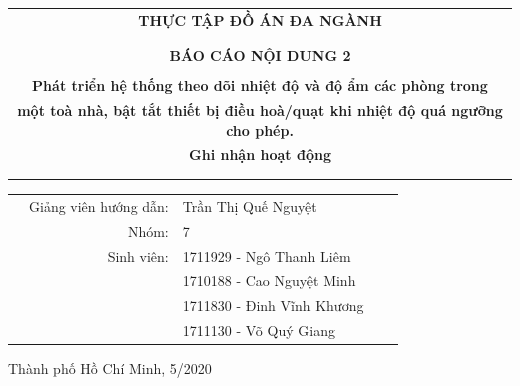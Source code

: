 \begin{titlepage}
\begin{center}
\begin{tabular}{c}
\multicolumn{1}{c}{\textbf{{\Huge THỰC TẬP ĐỒ ÁN ĐA NGÀNH}}}\\
\\ \hline \\
\textbf{{\Large BÁO CÁO NỘI DUNG 2}}\\
\\
\textbf{{\large Phát triển hệ thống theo dõi nhiệt độ và độ ẩm các phòng trong  }}\\
\textbf{{\large một toà nhà, bật tắt thiết bị điều hoà/quạt khi nhiệt độ quá ngưỡng cho phép. }}\\
\textbf{{\large Ghi nhận hoạt động}}\\
\\ \hline \\
\end{tabular}
\end{center}
	\begin{table}[h]
	\begin{tabular}{rrlrr}
		\hspace{5cm} 
		& {\large Giảng viên hướng dẫn}: & {\large Trần Thị Quế Nguyệt} & & \\
		& {\large Nhóm}: & {\large 7} & & \\
		& {\large Sinh viên}: & {\large 1711929 - Ngô Thanh Liêm } \\
		& {} & {\large 1710188 - Cao Nguyệt Minh } \\
		& {} & {\large 1711830 - Đinh Vĩnh Khương } \\
		& {} & {\large 1711130 - Võ Quý Giang} \\
	\end{tabular}
\end{table}

\vspace{3cm}

\begin{center}
{\footnotesize Thành phố Hồ Chí Minh, 5/2020}
\end{center}

\end{titlepage}
